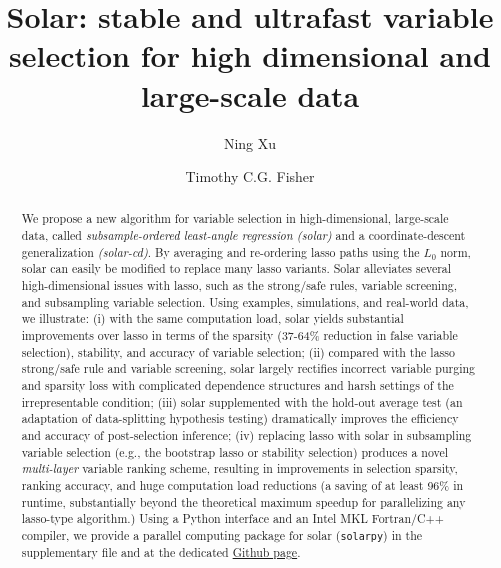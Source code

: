 \documentclass[11pt,authoryear]{elsarticle}
\begin{document}
\title{Solar: stable and ultrafast variable selection for high dimensional and large-scale data}

\author{Ning Xu}
\address{School of Economics, University of Sydney, Australia}

\author{Timothy C.G. Fisher}
\address{School of Economics, University of Sydney, Australia}


\begin{abstract}
  We propose a new algorithm for variable selection in high-dimensional, large-scale data, called \emph{subsample-ordered least-angle regression (solar)} and a coordinate-descent generalization \emph{(solar-cd)}. By averaging and re-ordering lasso paths using the $L_0$ norm, solar can easily be modified to replace many lasso variants. Solar alleviates several high-dimensional issues with lasso, such as the strong/safe rules, variable screening, and subsampling variable selection. Using examples, simulations, and real-world data, we illustrate: (i) with the same computation load, solar yields substantial improvements over lasso in terms of the sparsity (37-64\% reduction in false variable selection), stability, and accuracy of variable selection; (ii) compared with the lasso strong/safe rule and variable screening, solar largely rectifies incorrect variable purging and sparsity loss with complicated dependence structures and harsh settings of the irrepresentable condition; (iii) solar supplemented with the hold-out average test (an adaptation of data-splitting hypothesis testing) dramatically improves the efficiency and accuracy of post-selection inference; (iv) replacing lasso with solar in subsampling variable selection (e.g., the bootstrap lasso or stability selection) produces a novel \emph{multi-layer} variable ranking scheme, resulting in improvements in selection sparsity, ranking accuracy, and huge computation load reductions (a saving of at least 96\% in runtime, substantially beyond the theoretical maximum speedup for parallelizing any lasso-type algorithm.) Using a Python interface and an Intel MKL Fortran/C++ compiler, we provide a parallel computing package for solar (\texttt{solarpy}) in the supplementary file and at the dedicated \href{https://github.com/isaac2math/solarpy}{Github page}.
\end{abstract}
\end{document}
